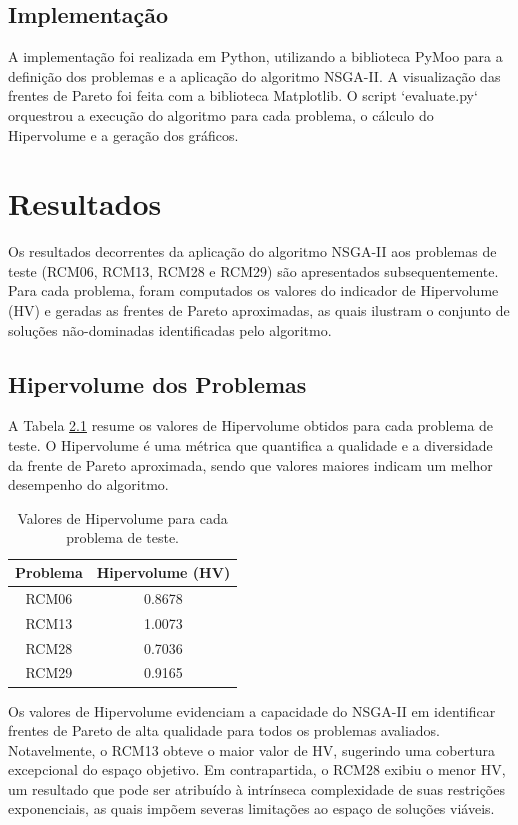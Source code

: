 \documentclass[12pt,openright,oneside,a4paper,english,brazil]{abntex2}
\begin{document}
\section{Implementação}
A implementação foi realizada em Python, utilizando a biblioteca PyMoo para a definição dos problemas e a aplicação do algoritmo NSGA-II. A visualização das frentes de Pareto foi feita com a biblioteca Matplotlib. O script `evaluate.py` orquestrou a execução do algoritmo para cada problema, o cálculo do Hipervolume e a geração dos gráficos.

\chapter{Resultados}
Os resultados decorrentes da aplicação do algoritmo NSGA-II aos problemas de teste (RCM06, RCM13, RCM28 e RCM29) são apresentados subsequentemente. Para cada problema, foram computados os valores do indicador de Hipervolume (HV) e geradas as frentes de Pareto aproximadas, as quais ilustram o conjunto de soluções não-dominadas identificadas pelo algoritmo.

\section{Hipervolume dos Problemas}
A Tabela \ref{tab:hipervolume} resume os valores de Hipervolume obtidos para cada problema de teste. O Hipervolume é uma métrica que quantifica a qualidade e a diversidade da frente de Pareto aproximada, sendo que valores maiores indicam um melhor desempenho do algoritmo.

\begin{table}[h!]
    \centering
    \caption{Valores de Hipervolume para cada problema de teste.}
    \label{tab:hipervolume}
    \begin{tabular}{|c|c|}
        \hline
        \textbf{Problema} & \textbf{Hipervolume (HV)} \\
        \hline
        RCM06 & 0.8678 \\
        RCM13 & 1.0073 \\
        RCM28 & 0.7036 \\
        RCM29 & 0.9165 \\
        \hline
    \end{tabular}
\end{table}

Os valores de Hipervolume evidenciam a capacidade do NSGA-II em identificar frentes de Pareto de alta qualidade para todos os problemas avaliados. Notavelmente, o RCM13 obteve o maior valor de HV, sugerindo uma cobertura excepcional do espaço objetivo. Em contrapartida, o RCM28 exibiu o menor HV, um resultado que pode ser atribuído à intrínseca complexidade de suas restrições exponenciais, as quais impõem severas limitações ao espaço de soluções viáveis.
\end{document}
